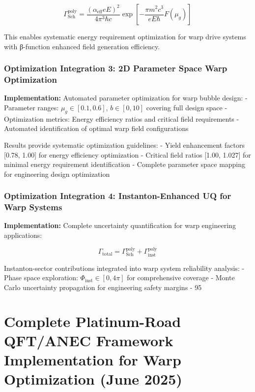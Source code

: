 \documentclass[11pt]{article}
\begin{document}
\begin{equation}
\Gamma_{\text{Sch}}^{\text{poly}} = \frac{(\alpha_{\text{eff}} eE)^2}{4\pi^3\hbar c} \exp\left[-\frac{\pi m^2c^3}{eE\hbar}F(\mu_g)\right]
\end{equation}

This enables systematic energy requirement optimization for warp drive systems with β-function enhanced field generation efficiency.

\subsubsection{Optimization Integration 3: 2D Parameter Space Warp Optimization}

\textbf{Implementation:} Automated parameter optimization for warp bubble design:
- Parameter ranges: $\mu_g \in [0.1, 0.6]$, $b \in [0, 10]$ covering full design space
- Optimization metrics: Energy efficiency ratios and critical field requirements
- Automated identification of optimal warp field configurations

Results provide systematic optimization guidelines:
- Yield enhancement factors [0.78, 1.00] for energy efficiency optimization
- Critical field ratios [1.00, 1.027] for minimal energy requirement identification
- Complete parameter space mapping for engineering design optimization

\subsubsection{Optimization Integration 4: Instanton-Enhanced UQ for Warp Systems}

\textbf{Implementation:} Complete uncertainty quantification for warp engineering applications:

\begin{equation}
\Gamma_{\text{total}} = \Gamma_{\text{Sch}}^{\text{poly}} + \Gamma_{\text{inst}}^{\text{poly}}
\end{equation}

Instanton-sector contributions integrated into warp system reliability analysis:
- Phase space exploration: $\Phi_{\text{inst}} \in [0, 4\pi]$ for comprehensive coverage
- Monte Carlo uncertainty propagation for engineering safety margins
- 95%

\section{Complete Platinum-Road QFT/ANEC Framework Implementation for Warp Optimization (June 2025)}
\end{document}

